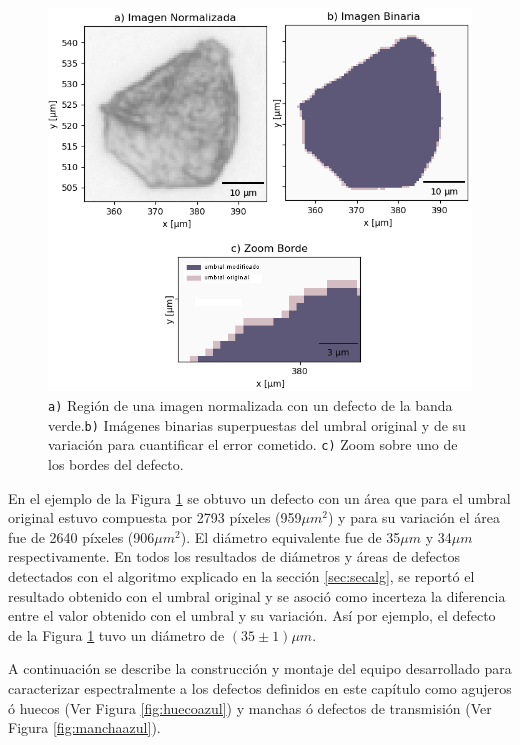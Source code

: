 \begin{figure}
\centering
\includegraphics[scale=1.1]{Figs/cuantificaciondefectos/erroresborde.png}
\caption{\texttt{a)} Región de una imagen normalizada con un defecto de la banda verde.\texttt{b)} Imágenes binarias superpuestas del umbral original y de su variación para cuantificar el error cometido. \texttt{c)} Zoom sobre uno de los bordes del defecto.}
\label{fig:bordedefe}
\end{figure}

En el ejemplo de la Figura \ref{fig:bordedefe} se obtuvo un defecto con un área que para el umbral original estuvo compuesta por 2793 píxeles (959$\mu m^{2}$) y para su variación el área fue de 2640 píxeles (906$\mu m^{2}$). El diámetro equivalente fue de 35$\mu m$ y 34$\mu m$ respectivamente. En todos los resultados de diámetros y áreas de defectos detectados con el algoritmo explicado en la sección \ref{sec:secalg}, se reportó el resultado obtenido con el umbral original y se asoció como incerteza la diferencia entre el valor obtenido con el umbral y su variación. Así por ejemplo, el defecto de la Figura \ref{fig:bordedefe} tuvo un diámetro de $(35 \pm 1) \mu m$.

A continuación se describe la construcción y montaje del equipo desarrollado para caracterizar espectralmente a los defectos definidos en este capítulo como agujeros ó huecos (Ver Figura  \ref{fig:huecoazul}) y manchas ó defectos de transmisión (Ver Figura \ref{fig:manchaazul}).